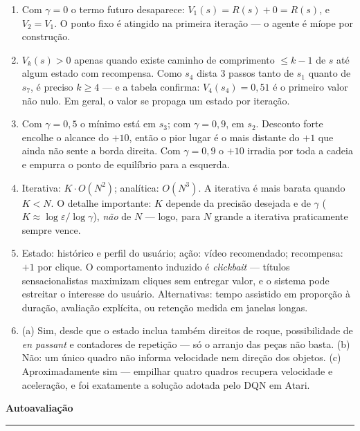 \documentclass[10pt, a4paper]{article}
\newcounter{secao}
\newcommand{\secao}[1]{%
  \stepcounter{secao}%
  \vspace{0.7em}%
  \noindent{\color{rlLaranja}\rule{1.6em}{2pt}}\hspace{0.5em}%
  {\color{rlCinza}\footnotesize\bfseries\thesecao}\hspace{0.35em}%
  {\color{rlAzul}\large\bfseries #1}%
  \par\vspace{-0.15em}%
  {\color{rlAzul!22}\rule{\linewidth}{0.6pt}}%
  \par\vspace{0.25em}}
\newcommand{\rec}{R}
\begin{document}
{\footnotesize
\begin{enumerate}[leftmargin=1.4em, itemsep=0.35ex, topsep=0.2ex]
  \item Com $\gamma = 0$ o termo futuro desaparece:
        $V_1(s) = \rec(s) + 0 = \rec(s)$, e $V_2 = V_1$. O ponto fixo é
        atingido na primeira iteração — o agente é míope por construção.
  \item $V_k(s) > 0$ apenas quando existe caminho de comprimento $\le k-1$ de
        $s$ até algum estado com recompensa. Como $s_4$ dista 3 passos tanto de
        $s_1$ quanto de $s_7$, é preciso $k \ge 4$ — e a tabela confirma:
        $V_4(s_4) = 0{,}51$ é o primeiro valor não nulo. Em geral, o valor se
        propaga um estado por iteração.
  \item Com $\gamma = 0{,}5$ o mínimo está em $s_3$; com $\gamma = 0{,}9$, em
        $s_2$. Desconto forte encolhe o alcance do $+10$, então o pior lugar é
        o mais distante do $+1$ que ainda não sente a borda direita. Com
        $\gamma = 0{,}9$ o $+10$ irradia por toda a cadeia e empurra o ponto de
        equilíbrio para a esquerda.
  \item Iterativa: $K \cdot O(N^2)$; analítica: $O(N^3)$. A iterativa é mais
        barata quando $K < N$. O detalhe importante: $K$ depende da precisão
        desejada e de $\gamma$
        ($K \approx \log \varepsilon / \log \gamma$), \emph{não} de $N$ —
        logo, para $N$ grande a iterativa praticamente sempre vence.
  \item Estado: histórico e perfil do usuário; ação: vídeo recomendado;
        recompensa: $+1$ por clique. O comportamento induzido é
        \emph{clickbait} — títulos sensacionalistas maximizam cliques sem
        entregar valor, e o sistema pode estreitar o interesse do usuário.
        Alternativas: tempo assistido em proporção à duração, avaliação
        explícita, ou retenção medida em janelas longas.
  \item (a) Sim, desde que o estado inclua também direitos de roque,
        possibilidade de \emph{en passant} e contadores de repetição — só o
        arranjo das peças não basta. (b) Não: um único quadro não informa
        velocidade nem direção dos objetos. (c) Aproximadamente sim — empilhar
        quatro quadros recupera velocidade e aceleração, e foi exatamente a
        solução adotada pelo DQN em Atari.
\end{enumerate}}

\secao{Autoavaliação}
\end{document}

